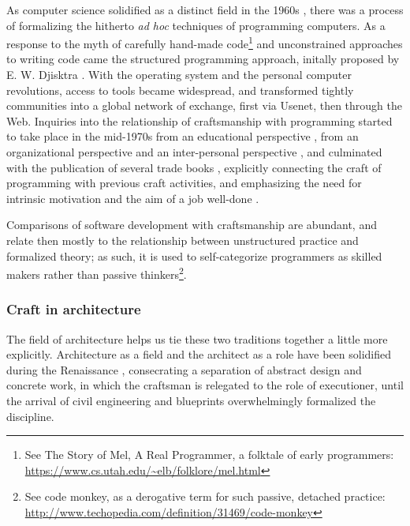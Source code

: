 As computer science solidified as a distinct field in the 1960s \citep{tedre_development_2006}, there was a process of formalizing the hitherto \textit{ad hoc} techniques of programming computers. As a response to the myth of carefully hand-made code\footnote{See The Story of Mel, A Real Programmer, a folktale of early programmers: \url{https://www.cs.utah.edu/~elb/folklore/mel.html}} and unconstrained approaches to writing code came the structured programming approach, initally proposed by E. W. Djisktra \citep{dijkstra_chapter_1972}. With the operating system and the personal computer revolutions, access to tools became widespread, and transformed tightly communities into a global network of exchange, first via Usenet, then through the Web. Inquiries into the relationship of craftsmanship with programming started to take place in the mid-1970s from an educational perspective \citep{dijkstra_craftsman_1982}, from an organizational perspective \citep{brooks_mythical_1975} and an inter-personal perspective \citep{weinberg_psychology_1998}, and culminated with the publication of several trade books \citep{martin_clean_2008,hendrickson_software_2002}, explicitly connecting the craft of programming with previous craft activities, and emphasizing the need for intrinsic motivation and the aim of a job well-done \citep{hoover_apprenticeship_2009,goodliffe_code_2007}.

Comparisons of software development with craftsmanship are abundant, and relate then mostly to the relationship between unstructured practice and formalized theory; as such, it is used to self-categorize programmers as skilled makers rather than passive thinkers\footnote{See code monkey, as a derogative term for such passive, detached practice: \url{http://www.techopedia.com/definition/31469/code-monkey}}.

\subsubsection{Craft in architecture}

The field of architecture helps us tie these two traditions together a little more explicitly. Architecture as a field and the architect as a role have been solidified during the Renaissance \citep{pevsner_term_1942}, consecrating a separation of abstract design and concrete work, in which the craftsman is relegated to the role of executioner, until the arrival of civil engineering and blueprints overwhelmingly formalized the discipline.

